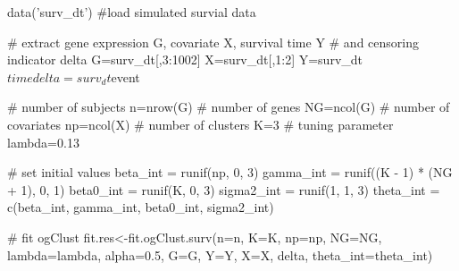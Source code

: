 \documentclass[a4paper]{book}
\begin{document}
%
\begin{Examples}
\begin{ExampleCode}
  data('surv_dt') #load simulated survial data

  # extract gene expression G, covariate X, survival time Y
  # and censoring indicator delta
  G=surv_dt[,3:1002]
  X=surv_dt[,1:2]
  Y=surv_dt$time
  delta=surv_dt$event

  # number of subjects
  n=nrow(G)
  # number of genes
  NG=ncol(G)
  # number of covariates
  np=ncol(X)
  # number of clusters
  K=3
  # tuning parameter
  lambda=0.13

  # set initial values
  beta_int = runif(np, 0, 3)
  gamma_int = runif((K - 1) * (NG + 1), 0, 1)
  beta0_int = runif(K, 0, 3)
  sigma2_int = runif(1, 1, 3)
  theta_int = c(beta_int, gamma_int, beta0_int, sigma2_int)

  # fit ogClust
  fit.res<-fit.ogClust.surv(n=n, K=K, np=np, NG=NG, lambda=lambda,
                         alpha=0.5, G=G, Y=Y, X=X, delta, theta_int=theta_int)
\end{ExampleCode}
\end{Examples}
\printindex{}
\end{document}
